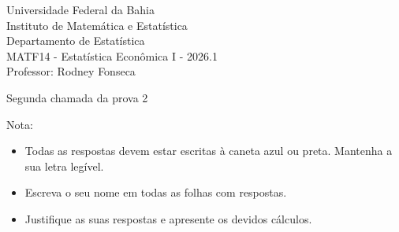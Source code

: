 \documentclass{article}
\date{--/--/----} %
\begin{document}
\begin{flushleft}
	Universidade Federal da Bahia\\
	Instituto de Matemática e Estatística\\
	Departamento de Estatística\\
	MATF14 - Estatística Econômica I - 2026.1\\
	Professor: Rodney Fonseca \\
\end{flushleft}

\begin{center}
	\begin{Large}
		Segunda chamada da prova 2 \\
	\end{Large}	
\end{center}

\hspace{2em} Nota: 

\vspace{1em}

\begin{flushleft}
\begin{small}

\begin{itemize}
	\item Todas as respostas devem estar escritas à caneta azul ou preta. Mantenha a sua letra legível.
	\item Escreva o seu nome em todas as folhas com respostas.
	\item Justifique as suas respostas e apresente os devidos cálculos.
\end{itemize}

\end{small}
\end{flushleft}

\vspace{1em}

\end{document}
